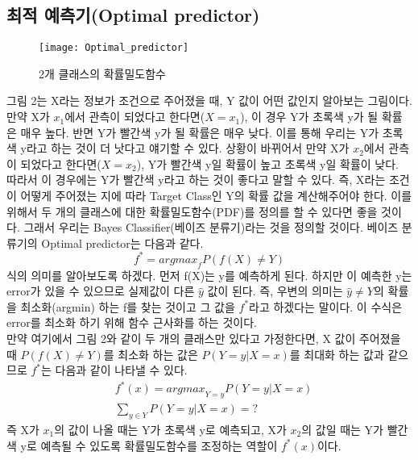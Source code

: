\documentclass[a4paper]{oblivoir}
\begin{document}
\subsection{최적 예측기(Optimal predictor)}
\begin{figure}[ht]\centering
\texttt{[image: Optimal\_predictor]}\caption{2개 클래스의 확률밀도함수}\label{Fig:3-2}
\end{figure}
그림 2는 X라는 정보가 조건으로 주어졌을 때, Y 값이 어떤 값인지 알아보는 그림이다. 만약 X가 $x_1$에서 관측이 되었다고 한다면($X=x_1$), 이 경우 Y가 초록색 y가 될 확률은 매우 높다. 반면 Y가 빨간색 y가 될 확률은 매우 낮다. 이를 통해 우리는 Y가 초록색 y라고 하는 것이 더 낫다고 얘기할 수 있다. 상황이 바뀌어서 만약 X가 $x_2$에서 관측이 되었다고 한다면($X=x_2$), Y가 빨간색 y일 확률이 높고 초록색 y일 확률이 낮다. 따라서 이 경우에는 Y가 빨간색 y라고 하는 것이 좋다고 말할 수 있다. 즉, X라는 조건이 어떻게 주어졌는 지에 따라 Target Class인 Y의 확률 값을 계산해주어야 한다. 이를 위해서 두 개의 클래스에 대한 확률밀도함수(PDF)를 정의를 할 수 있다면 좋을 것이다. 그래서 우리는 Bayes Classifier(베이즈 분류기)라는 것을 정의할 것이다. 베이즈 분류기의 Optimal predictor는 다음과 같다.
\begin{equation}
f^*={argmax}_{f}P(f(X) \neq Y)
\label{eq:3-1}
\end{equation}
 식의 의미를 알아보도록 하겠다. 먼저 f(X)는 y를 예측하게 된다. 하지만 이 예측한 y는 error가 있을 수 있으므로 실제값이 다른 $\hat{y}$ 값이 된다. 즉, 우변의 의미는 $\hat{y}\neq Y$의 확률을 최소화(argmin) 하는 f를 찾는 것이고 그 값을 $f^*$라고 하겠다는 말이다. 이 수식은 error를 최소화 하기 위해 함수 근사화를 하는 것이다.\\
\indent 만약 여기에서 그림 2와 같이 두 개의 클래스만 있다고 가정한다면, X 값이 주어졌을 때 $P(f(X)\neq Y)$를 최소화 하는 값은 $P(Y=y|X=x)$를 최대화 하는 값과 같으므로 $f^*$는 다음과 같이 나타낼 수 있다.
\begin{align}
&f^*(x)={argmax}_{Y=y}P(Y=y|X=x)\label{eq:3-2}\\
&\sum_{y \in Y} P(Y=y|X=x)=?\label{eq:3-3}
\end{align}
\indent 즉 X가 $x_1$의 값이 나올 때는 Y가 초록색 y로 예측되고, X가 $x_2$의 값일 때는 Y가 빨간색 y로 예측될 수 있도록 확률밀도함수를 조정하는 역할이 $f^*(x)$이다. \\\\
\end{document}
